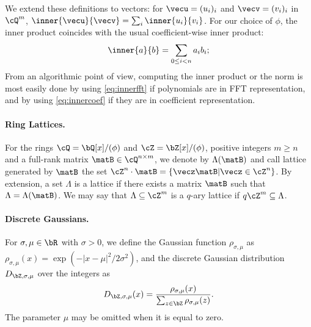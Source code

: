 We extend these definitions to vectors: for $\vecu = (u_i)_i$ and $\vecv = (v_i)_i$ in $\cQ^{m}$, $\inner{\vecu}{\vecv} = \sum_i \inner{u_i}{v_i}$.
For our choice of $\phi$, the inner product coincides with the usual coefficient-wise inner product: 
\begin{equation}\label{eq:innercoef}
\inner{a}{b} = \sum_{0 \leq i < n} a_i b_i; 
\end{equation}
From an algorithmic point of view, computing the inner product or the norm is most easily done by using \eqref{eq:innerfft} if polynomials are in FFT representation, and by using \eqref{eq:innercoef} if they are in coefficient representation.

\paragraph{Ring Lattices.} For the rings $\cQ = \bQ[x]/(\phi)$ and $\cZ = \bZ[x]/(\phi)$, positive integers $m \geq n$ and a full-rank matrix $\matB \in \cQ^{n\times m}$, we denote by $\Lambda(\matB)$ and call lattice generated by $\matB$ the set $\cZ^n \cdot \matB = \{ \vecz \matB | \vecz \in \cZ^{n}\}$. By extension, a set $\Lambda$ is a lattice if there exists a matrix $\matB$ such that $\Lambda = \Lambda(\matB)$. We may say that $\Lambda \subseteq \cZ^m$ is a $q$-ary lattice if $ q\cZ^m \subseteq \Lambda$.

\paragraph{Discrete Gaussians.} For $\sigma, \mu\in \bR$ with $\sigma >0$, we define the Gaussian function $\rho_{\sigma,\mu}$ as $\rho_{\sigma,\mu}(x) = \exp(-|x-\mu|^2/2\sigma^2)$, and the discrete Gaussian distribution $D_{\bZ,\sigma,\mu}$ over the integers as 
\begin{equation} 
D_{\bZ,\sigma,\mu}(x) = \frac{\rho_{\sigma,\mu}(x)}{ \sum_{z \in \bZ} \rho_{\sigma,\mu}(z) } .
\end{equation}
The parameter $\mu$ may be omitted when it is equal to zero.


